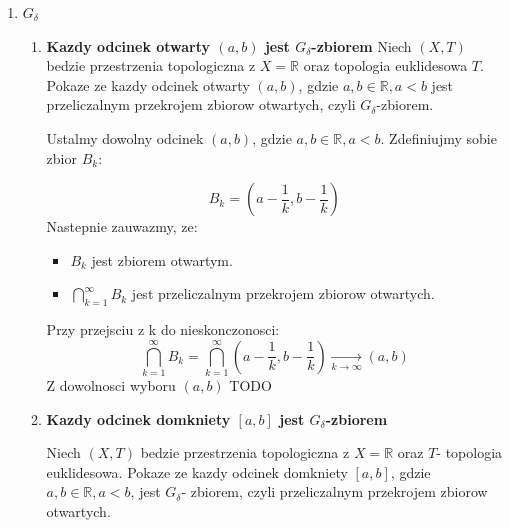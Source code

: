 \documentclass{article}
\begin{document}
\begin{enumerate}[align=left]
\begin{enumerate}[label=(\alph*)]
\begin{enumerate}[label=(\roman*)]
\begin{itemize}
                    \end{itemize}
                Przy przejsciu z k do nieskonczonosci:
                   $$\bigcup\limits_{k=1}^{\infty}B_{k} = \bigcup\limits_{k = 1}^{\infty}[a + \frac{1}{k}, b + \frac{1}{k}] \xrightarrow[k \rightarrow \infty]{} (a,b)$$
                   Z dowolnosci wyboru $[a,b]$ wnioskujemy, ze kazdy odcinek $[a,b]$ jest w topologii euklidesowej na $\mathbb{R}$, zbiorem $F_{\sigma}$

                \end{enumerate}
                \item $G_{\delta}$

                    \begin{enumerate}[label = (\roman*)]
                        \item \textbf{Kazdy odcinek otwarty $(a,b)$ jest $G_{\delta}$-zbiorem}
                            Niech $(X,T)$ bedzie przestrzenia topologiczna z $X = \mathbb{R}$ oraz topologia euklidesowa $T$. Pokaze ze kazdy odcinek otwarty $(a,b)$, gdzie $a,b \in  \mathbb{R}, a < b$ jest przeliczalnym przekrojem zbiorow otwartych, czyli $G_{\delta}$-zbiorem.

                            Ustalmy dowolny odcinek $(a,b)$, gdzie $a,b \in \mathbb{R}, a < b$. Zdefiniujmy sobie zbior $B_{k}$:

                            $$B_{k} = (a - \frac{1}{k}, b - \frac{1}{k})$$Nastepnie zauwazmy, ze:
                            \begin{itemize}
                                \item $B_{k}$ jest zbiorem otwartym.
                                \item $\bigcap\limits_{k=1}^{\infty}B_{k}$ jest przeliczalnym przekrojem zbiorow otwartych. 
                                
                            \end{itemize}
                            Przy przejsciu z k do nieskonczonosci:
                            $$\bigcap\limits_{k=1}^{\infty}B_{k} = \bigcap\limits_{k=1}^{\infty}(a - \frac{1}{k}, b - \frac{1}{k}) \xrightarrow[k \rightarrow \infty]{} (a,b)$$
                            Z dowolnosci wyboru $(a,b)$ TODO
                        \item \textbf{Kazdy odcinek domkniety $[a,b]$ jest $G_{\delta}$-zbiorem}

                            Niech $(X,T)$ bedzie przestrzenia topologiczna z $X = \mathbb{R}$ oraz $T$- topologia euklidesowa. Pokaze ze kazdy odcinek domkniety $[a,b]$, gdzie $a,b \in \mathbb{R}, a < b$, jest $G_{\delta}$- zbiorem, czyli przeliczalnym przekrojem zbiorow otwartych. 


\end{enumerate}
\end{enumerate}
\end{enumerate}
\end{document}
